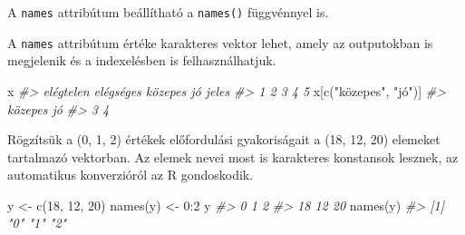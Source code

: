\documentclass[
]{book}
\newenvironment{Shaded}{\begin{snugshade}}{\end{snugshade}}
\newcommand{\CommentTok}[1]{\textcolor[rgb]{0.56,0.35,0.01}{\textit{#1}}}
\newcommand{\DecValTok}[1]{\textcolor[rgb]{0.00,0.00,0.81}{#1}}
\newcommand{\FunctionTok}[1]{\textcolor[rgb]{0.00,0.00,0.00}{#1}}
\newcommand{\NormalTok}[1]{#1}
\newcommand{\OtherTok}[1]{\textcolor[rgb]{0.56,0.35,0.01}{#1}}
\newcommand{\SpecialCharTok}[1]{\textcolor[rgb]{0.00,0.00,0.00}{#1}}
\newcommand{\StringTok}[1]{\textcolor[rgb]{0.31,0.60,0.02}{#1}}
\begin{document}
A \texttt{names} attribútum beállítható a \texttt{names()} függvénnyel is.

\begin{Shaded}
\end{Shaded}

A \texttt{names} attribútum értéke karakteres vektor lehet, amely az outputokban is megjelenik és a indexelésben is felhasználhatjuk.

\begin{Shaded}
\begin{Highlighting}[]
\NormalTok{x}
\CommentTok{\#\textgreater{} elégtelen elégséges   közepes        jó     jeles }
\CommentTok{\#\textgreater{}         1         2         3         4         5}
\NormalTok{x[}\FunctionTok{c}\NormalTok{(}\StringTok{"közepes"}\NormalTok{, }\StringTok{"jó"}\NormalTok{)]}
\CommentTok{\#\textgreater{} közepes      jó }
\CommentTok{\#\textgreater{}       3       4}
\end{Highlighting}
\end{Shaded}

Rögzítsük a (0, 1, 2) értékek előfordulási gyakoriságait a (18, 12, 20) elemeket tartalmazó vektorban. Az elemek nevei most is karakteres konstansok lesznek, az automatikus konverzióról az R gondoskodik.

\begin{Shaded}
\begin{Highlighting}[]
\NormalTok{y }\OtherTok{\textless{}{-}} \FunctionTok{c}\NormalTok{(}\DecValTok{18}\NormalTok{, }\DecValTok{12}\NormalTok{, }\DecValTok{20}\NormalTok{)}
\FunctionTok{names}\NormalTok{(y) }\OtherTok{\textless{}{-}} \DecValTok{0}\SpecialCharTok{:}\DecValTok{2}
\NormalTok{y}
\CommentTok{\#\textgreater{}  0  1  2 }
\CommentTok{\#\textgreater{} 18 12 20}
\FunctionTok{names}\NormalTok{(y)}
\CommentTok{\#\textgreater{} [1] "0" "1" "2"}
\end{Highlighting}
\end{Shaded}
\end{document}
